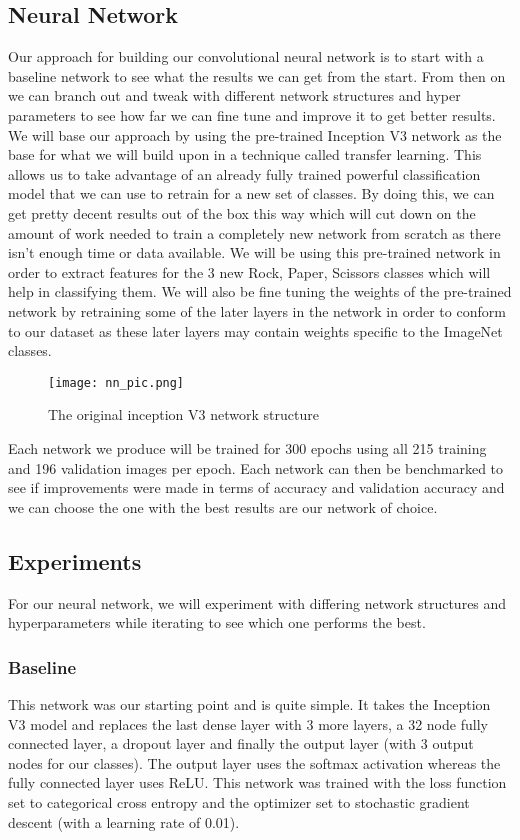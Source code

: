 \subsection{Neural Network}

Our approach for building our convolutional neural network is to start with a baseline network to see what the results we can get from the start. From then on we can branch out and tweak with different network structures and hyper parameters to see how far we can fine tune and improve it to get better results.
We will base our approach by using the pre-trained Inception V3 network as the base for what we will build upon in a technique called transfer learning. This allows us to take advantage of an already fully trained powerful classification model that we can use to retrain for a new set of classes. By doing this, we can get pretty decent results out of the box this way which will cut down on the amount of work needed to train a completely new network from scratch as there isn’t enough time or data available. We will be using this pre-trained network in order to extract features for the 3 new Rock, Paper, Scissors classes which will help in classifying them. We will also be fine tuning the weights of the pre-trained network by retraining some of the later layers in the network in order to conform to our dataset as these later layers may contain weights specific to the ImageNet classes.

\begin{figure}[h]
\texttt{[image: nn\_pic.png]}
\centering
\caption{The original inception V3 network structure}
\end{figure}

Each network we produce will be trained for 300 epochs using all 215 training and 196 validation images per epoch. Each network can then be benchmarked to see if improvements were made in terms of accuracy and validation accuracy and we can choose the one with the best results are our network of choice.
\subsection{Experiments}

For our neural network, we will experiment with differing network structures and hyperparameters while iterating to see which one performs the best.
\subsubsection{Baseline}
This network was our starting point and is quite simple. It takes the Inception V3 model and replaces the last dense layer with 3 more layers, a 32 node fully connected layer, a dropout layer and finally the output layer (with 3 output nodes for our classes). The output layer uses the softmax activation whereas the fully connected layer uses ReLU. This network was trained with the loss function set to categorical cross entropy and the optimizer set to stochastic gradient descent (with a learning rate of 0.01).

